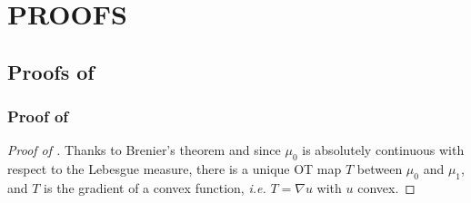 \documentclass[twoside]{article}
\begin{document}
\section{PROOFS}

\subsection{Proofs of }


\subsubsection{Proof of } \label{proof:prop_geodesic_rays}


\begin{proof}[Proof of ]

    Thanks to Brenier's theorem \citep{brenier1991polar} and since $\mu_0$ is absolutely continuous with respect to the Lebesgue measure, there is a unique OT map $T$ between $\mu_0$ and $\mu_1$, and $T$ is the gradient of a convex function, \emph{i.e.} $T=\nabla u$ with $u$ convex.


\end{proof}
\end{document}
